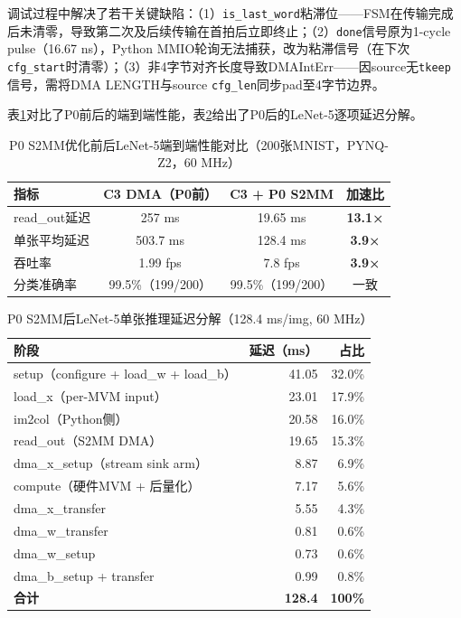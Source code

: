 \documentclass[12pt, a4paper]{article}
\begin{document}
调试过程中解决了若干关键缺陷：（1）\texttt{is\_last\_word}粘滞位——FSM在传输完成后未清零，导致第二次及后续传输在首拍后立即终止；（2）\texttt{done}信号原为1-cycle pulse（16.67 ns），Python MMIO轮询无法捕获，改为粘滞信号（在下次\texttt{cfg\_start}时清零）；（3）非4字节对齐长度导致DMAIntErr——因source无\texttt{tkeep}信号，需将DMA LENGTH与source \texttt{cfg\_len}同步pad至4字节边界。

表\ref{tab:p0_benchmark}对比了P0前后的端到端性能，表\ref{tab:p0_latency}给出了P0后的LeNet-5逐项延迟分解。

\begin{table}[H]
    \centering
    \caption{P0 S2MM优化前后LeNet-5端到端性能对比（200张MNIST，PYNQ-Z2，60 MHz）}
    \label{tab:p0_benchmark}
    \begin{tabular}{lccc}
        \toprule
        指标 & C3 DMA（P0前） & C3 + P0 S2MM & 加速比 \\
        \midrule
        read\_out延迟 & 257 ms & 19.65 ms & \textbf{13.1×} \\
        单张平均延迟 & 503.7 ms & 128.4 ms & \textbf{3.9×} \\
        吞吐率 & 1.99 fps & 7.8 fps & \textbf{3.9×} \\
        分类准确率 & 99.5\%（199/200） & 99.5\%（199/200） & 一致 \\
        \bottomrule
    \end{tabular}
\end{table}

\begin{table}[H]
    \centering
    \caption{P0 S2MM后LeNet-5单张推理延迟分解（128.4 ms/img, 60 MHz）}
    \label{tab:p0_latency}
    \small
    \begin{tabular}{lrr}
        \toprule
        阶段 & 延迟（ms） & 占比 \\
        \midrule
        setup（configure + load\_w + load\_b） & 41.05 & 32.0\% \\
        load\_x（per-MVM input） & 23.01 & 17.9\% \\
        im2col（Python侧） & 20.58 & 16.0\% \\
        read\_out（S2MM DMA） & 19.65 & 15.3\% \\
        dma\_x\_setup（stream sink arm） & 8.87 & 6.9\% \\
        compute（硬件MVM + 后量化） & 7.17 & 5.6\% \\
        dma\_x\_transfer & 5.55 & 4.3\% \\
        dma\_w\_transfer & 0.81 & 0.6\% \\
        dma\_w\_setup & 0.73 & 0.6\% \\
        dma\_b\_setup + transfer & 0.99 & 0.8\% \\
        \midrule
        \textbf{合计} & \textbf{128.4} & \textbf{100\%} \\
        \bottomrule
    \end{tabular}
\end{table}
\end{document}
